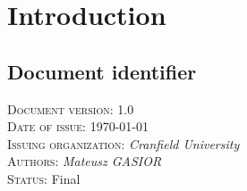 \chapter{Introduction} \label{chp:introduction}
	\begin{comment}
		Introduce the following subordinate sections. This section identifies the issuing organization and the
		details of issuance. It includes required approvals and status (DRAFT/FINAL) of the document. It is
		here that the scope is described and references identified.
	\end{comment}

\section{Document identifier} \label{s:introduction:document-identifier}
	\begin{comment}
		Uniquely identify a version of the document by including information such as the date of issue, the
		issuing organization, the author(s), the approval signatures (possibly electronic), and the status/version
		(e.g., draft, reviewed, corrected, or final). Identifying information may also include the reviewers and
		pertinent managers. This information is commonly put on an early page in the document, such as the
		cover page or the pages immediately following it. Some organizations put this information at the end
		of the document. This information may also be kept in a place other than in the text of the document
		(e.g., in the configuration management system or in the header or footer of the document).
	\end{comment}
	\textsc{Document version:} 1.0 \\
	\textsc{Date of issue:} \today \\
	\textsc{Issuing organization:} \textit{Cranfield University} \\
	\textsc{Authors:} \textit{Mateusz GASIOR} \\
	\textsc{Status:} Final
